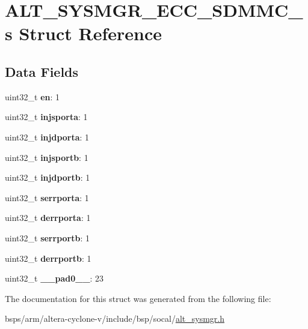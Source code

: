 \hypertarget{structALT__SYSMGR__ECC__SDMMC__s}{}\section{A\+L\+T\+\_\+\+S\+Y\+S\+M\+G\+R\+\_\+\+E\+C\+C\+\_\+\+S\+D\+M\+M\+C\+\_\+s Struct Reference}
\label{structALT__SYSMGR__ECC__SDMMC__s}
\subsection*{Data Fields}
\begin{DoxyCompactItemize}
\item 
\mbox{\label{structALT__SYSMGR__ECC__SDMMC__s_a4ceef8d338d7e3c43f487e6dd6bce21e}} 
uint32\+\_\+t {\bfseries en}\+: 1
\item 
\mbox{\label{structALT__SYSMGR__ECC__SDMMC__s_ae12aac63e3ad996cf538c1a902e7ca71}} 
uint32\+\_\+t {\bfseries injsporta}\+: 1
\item 
\mbox{\label{structALT__SYSMGR__ECC__SDMMC__s_a36dd065fc1817a1cf61fe3a4a0c2f331}} 
uint32\+\_\+t {\bfseries injdporta}\+: 1
\item 
\mbox{\label{structALT__SYSMGR__ECC__SDMMC__s_a9b76df21c606c74af3a44c7e555b4cbc}} 
uint32\+\_\+t {\bfseries injsportb}\+: 1
\item 
\mbox{\label{structALT__SYSMGR__ECC__SDMMC__s_a0913153a7a9d41fab124b2b40992e4ed}} 
uint32\+\_\+t {\bfseries injdportb}\+: 1
\item 
\mbox{\label{structALT__SYSMGR__ECC__SDMMC__s_abb7e1f8ea0cbe6a79b81ee11a80b3045}} 
uint32\+\_\+t {\bfseries serrporta}\+: 1
\item 
\mbox{\label{structALT__SYSMGR__ECC__SDMMC__s_a10bdf2df135405375953ae24e70c9d07}} 
uint32\+\_\+t {\bfseries derrporta}\+: 1
\item 
\mbox{\label{structALT__SYSMGR__ECC__SDMMC__s_a93a63bdfb6e4b401057dfb09606b5ef5}} 
uint32\+\_\+t {\bfseries serrportb}\+: 1
\item 
\mbox{\label{structALT__SYSMGR__ECC__SDMMC__s_a70aa3f0090903a8f1ebf7d93c1288935}} 
uint32\+\_\+t {\bfseries derrportb}\+: 1
\item 
\mbox{\label{structALT__SYSMGR__ECC__SDMMC__s_a466f7992422aaf61f242c09c6f6b9d6c}} 
uint32\+\_\+t {\bfseries \+\_\+\+\_\+pad0\+\_\+\+\_\+}\+: 23
\end{DoxyCompactItemize}


The documentation for this struct was generated from the following file\+:\begin{DoxyCompactItemize}
\item 
bsps/arm/altera-\/cyclone-\/v/include/bsp/socal/\mbox{\hyperlink{alt__sysmgr_8h}{alt\+\_\+sysmgr.\+h}}\end{DoxyCompactItemize}
